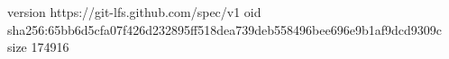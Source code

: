 version https://git-lfs.github.com/spec/v1
oid sha256:65bb6d5cfa07f426d232895ff518dea739deb558496bee696e9b1af9dcd9309c
size 174916
